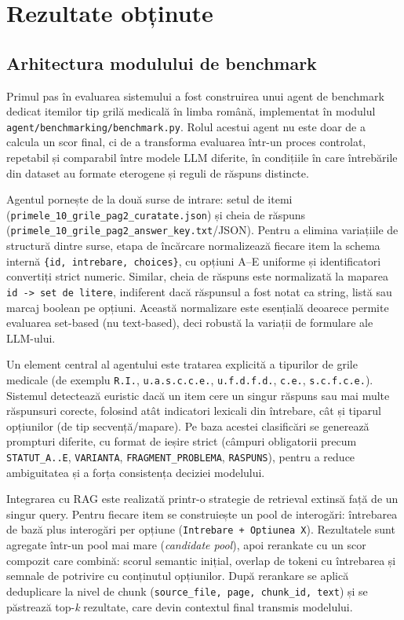 \documentclass[12pt, a4paper, oneside, romanian]{teza-upb}
\begin{document}
\chapter{Rezultate obținute}

\section{Arhitectura modulului de benchmark}

Primul pas în evaluarea sistemului a fost construirea unui agent de benchmark dedicat itemilor tip grilă medicală în limba română, implementat în modulul \texttt{agent/benchmarking/benchmark.py}. Rolul acestui agent nu este doar de a calcula un scor final, ci de a transforma evaluarea într-un proces controlat, repetabil și comparabil între modele LLM diferite, în condițiile în care întrebările din dataset au formate eterogene și reguli de răspuns distincte.

Agentul pornește de la două surse de intrare: setul de itemi (\texttt{primele\_10\_grile\_pag2\_curatate.json}) și cheia de răspuns (\texttt{primele\_10\_grile\_pag2\_answer\_key.txt}/JSON). Pentru a elimina variațiile de structură dintre surse, etapa de încărcare normalizează fiecare item la schema internă \texttt{\{id, intrebare, choices\}}, cu opțiuni A--E uniforme și identificatori convertiți strict numeric. Similar, cheia de răspuns este normalizată la maparea \texttt{id -> set de litere}, indiferent dacă răspunsul a fost notat ca string, listă sau marcaj boolean pe opțiuni. Această normalizare este esențială deoarece permite evaluarea set-based (nu text-based), deci robustă la variații de formulare ale LLM-ului.

Un element central al agentului este tratarea explicită a tipurilor de grile medicale (de exemplu \texttt{R.I.}, \texttt{u.a.s.c.c.e.}, \texttt{u.f.d.f.d.}, \texttt{c.e.}, \texttt{s.c.f.c.e.}). Sistemul detectează euristic dacă un item cere un singur răspuns sau mai multe răspunsuri corecte, folosind atât indicatori lexicali din întrebare, cât și tiparul opțiunilor (de tip secvență/mapare). Pe baza acestei clasificări se generează prompturi diferite, cu format de ieșire strict (câmpuri obligatorii precum \texttt{STATUT\_A..E}, \texttt{VARIANTA}, \texttt{FRAGMENT\_PROBLEMA}, \texttt{RASPUNS}), pentru a reduce ambiguitatea și a forța consistența deciziei modelului.

Integrarea cu RAG este realizată printr-o strategie de retrieval extinsă față de un singur query. Pentru fiecare item se construiește un pool de interogări: întrebarea de bază plus interogări per opțiune (\texttt{Intrebare + Optiunea X}). Rezultatele sunt agregate într-un pool mai mare (\textit{candidate pool}), apoi rerankate cu un scor compozit care combină: scorul semantic inițial, overlap de tokeni cu întrebarea și semnale de potrivire cu conținutul opțiunilor. După rerankare se aplică deduplicare la nivel de chunk (\texttt{source\_file, page, chunk\_id, text}) și se păstrează top-\textit{k} rezultate, care devin contextul final transmis modelului.
\end{document}
